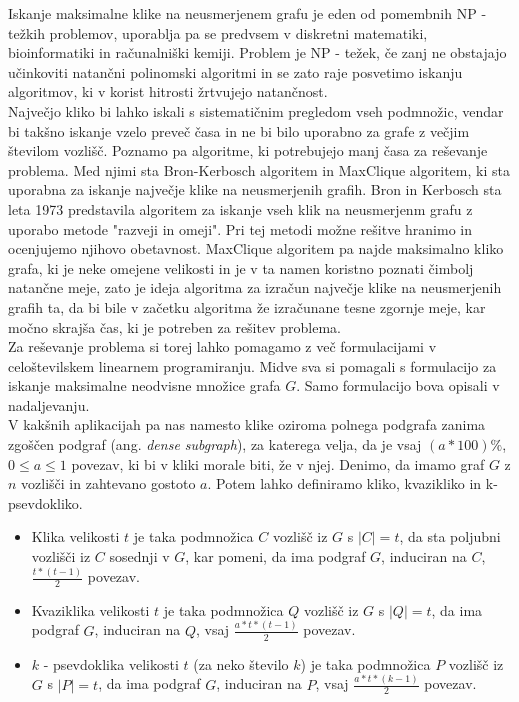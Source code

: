 \documentclass[12pt,a4paper]{amsart}
\theoremstyle{definition}
\theoremstyle{plain}
\begin{document}
Iskanje maksimalne klike na neusmerjenem grafu je eden od pomembnih NP - težkih problemov, uporablja pa se predvsem v diskretni matematiki, bioinformatiki in računalniški kemiji. Problem je NP - težek, če zanj ne obstajajo učinkoviti natančni polinomski algoritmi in se zato raje posvetimo iskanju algoritmov, ki v korist hitrosti žrtvujejo natančnost.\\

Največjo kliko bi lahko iskali s sistematičnim pregledom vseh podmnožic, vendar bi takšno iskanje vzelo preveč časa in ne bi bilo uporabno za grafe z večjim številom vozlišč. Poznamo pa algoritme, ki potrebujejo manj časa za reševanje problema. Med njimi sta Bron-Kerbosch algoritem in MaxClique algoritem, ki sta uporabna za iskanje največje klike na neusmerjenih grafih. Bron in Kerbosch sta leta 1973 predstavila algoritem za iskanje vseh klik na neusmerjenm grafu z uporabo metode "razveji in omeji". Pri tej metodi možne rešitve hranimo in ocenjujemo njihovo obetavnost. MaxClique algoritem pa najde maksimalno kliko grafa, ki je neke omejene velikosti in je v ta namen koristno poznati čimbolj natančne meje, zato je ideja algoritma za izračun največje klike na neusmerjenih grafih ta, da bi bile v začetku algoritma že izračunane tesne zgornje meje, kar močno skrajša čas, ki je potreben za rešitev problema.
\\

Za reševanje problema si torej lahko pomagamo z več formulacijami v celoštevilskem linearnem programiranju. Midve sva si pomagali s formulacijo za iskanje maksimalne neodvisne množice grafa $G$. Samo formulacijo bova opisali v nadaljevanju.\\

V kakšnih aplikacijah pa nas namesto klike oziroma polnega podgrafa zanima zgoščen podgraf (ang. \textit{dense subgraph}), za katerega velja, da je vsaj $(a*100)\%$, $0 \leq a \leq 1$  povezav, ki bi v kliki morale biti, že v njej.  Denimo, da imamo graf $G$ z $n$ vozlišči in zahtevano gostoto $a$. Potem lahko definiramo kliko, kvazikliko in k-psevdokliko. 
\\

\begin{itemize}
\item Klika velikosti $t$ je taka podmnožica $C$ vozlišč iz $G$ s $|C| = t$, da sta poljubni vozlišči iz $C$ sosednji v $G$, kar pomeni, da ima podgraf $G$, induciran na $C$, $\frac{t*(t-1)}{2}$ povezav.
\\

\item Kvaziklika velikosti $t$ je taka podmnožica $Q$ vozlišč iz $G$ s $|Q| = t$, da ima podgraf $G$, induciran na $Q$, vsaj $\frac{a*t*(t-1)}{2}$ povezav.
\\

\item $k$ - psevdoklika velikosti $t$ (za neko število $k$) je taka podmnožica $P$ vozlišč iz $G$ s $|P| = t$, da ima podgraf $G$, induciran na $P$, vsaj $\frac{a*t*(k-1)}{2}$ povezav.

\end{itemize}
\end{document}
